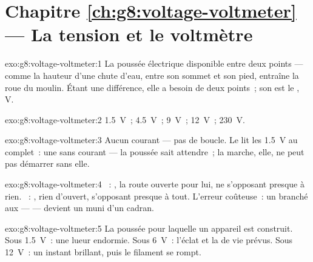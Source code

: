 \section*{Chapitre \ref{ch:g8:voltage-voltmeter} --- La tension et le voltmètre}

\begin{solution}{exo:g8:voltage-voltmeter:1}
La poussée électrique disponible entre deux points --- comme la
hauteur d'une chute d'eau, entre son sommet et son pied, entraîne la
roue du moulin. Étant une différence, elle a besoin de deux points~;
son  est le , \unit{V}.
\end{solution}

\begin{solution}{exo:g8:voltage-voltmeter:2}
\qty{1.5}{V}~; \qty{4.5}{V}~; \qty{9}{V}~; \qty{12}{V}~;
\qty{230}{V}.
\end{solution}

\begin{solution}{exo:g8:voltage-voltmeter:3}
Aucun courant --- pas de boucle. Le  lit les \qty{1.5}{V} au
complet~: une  sans courant --- la poussée sait attendre~; la
marche, elle, ne peut pas démarrer sans elle.
\end{solution}

\begin{solution}{exo:g8:voltage-voltmeter:4}
~: , la route ouverte pour lui, ne s'opposant
presque à rien. ~: , rien d'ouvert, s'opposant
presque à tout. L'erreur coûteuse~: un  branché aux
 ---  --- devient un  muni d'un
cadran.
\end{solution}

\begin{solution}{exo:g8:voltage-voltmeter:5}
La poussée pour laquelle un appareil est construit. Sous
\qty{1.5}{V}~: une lueur endormie. Sous \qty{6}{V}~: l'éclat et la
 de vie prévus. Sous \qty{12}{V}~: un instant brillant, puis le
filament se rompt.
\end{solution}

